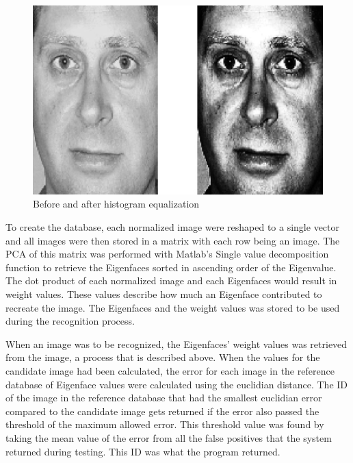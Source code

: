\begin{figure}[htbp]
    \centering
    \includegraphics[width=0.8\columnwidth]{withhist.jpg}
    \caption{Before and after histogram equalization}
    \label{fig:withhist}
\end{figure}

To create the database, each normalized image were reshaped to a single vector and all images were then stored in a matrix with each row being an image. The PCA of this matrix was performed with Matlab’s Single value decomposition function to retrieve the Eigenfaces sorted in ascending order of the Eigenvalue. The dot product of each normalized image and each Eigenfaces would result in weight values. These values describe how much an Eigenface contributed to recreate the image. The Eigenfaces and the weight values was stored to be used during the recognition process.

When an image was to be recognized, the Eigenfaces’ weight values was retrieved from the image, a process that is described above. When the values for the candidate image had been calculated, the error for each image in the reference database of Eigenface values were calculated using the euclidian distance. The ID of the image in the reference database that had the smallest euclidian error compared to the candidate image gets returned if the error also passed the threshold of the maximum allowed error. This threshold value was found by taking the mean value of the error from all the false positives that the system returned during testing. This ID was what the program returned.
